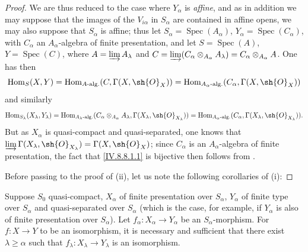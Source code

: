 \begin{proof}
We are thus reduced to the case where $Y_\alpha$ is \emph{affine}, and as in addition we may suppose that the images of the $V_{i\alpha}$ in $S_\alpha$ are contained in affine opens, we may also suppose that $S_\alpha$ is affine; thus let $S_\alpha=\operatorname{Spec}(A_\alpha)$, $Y_\alpha=\operatorname{Spec}(C_\alpha)$, with $C_\alpha$ an $A_\alpha$-algebra of finite presentation, and let $S=\operatorname{Spec}(A)$, $Y=\operatorname{Spec}(C)$, where $A=\varinjlim A_\lambda$ and $C=\varinjlim(C_\alpha\otimes_{A_\alpha}A_\lambda)=C_\alpha\otimes_{A_\alpha}A$.
One has then
\[
  \operatorname{Hom}_S(X,Y)=\operatorname{Hom}_{A\text{-alg.}}(C,\Gamma(X,\sh{O}_X))=\operatorname{Hom}_{A_\alpha\text{-alg.}}(C_\alpha,\Gamma(X,\sh{O}_X))
\]
 and similarly
\[
  \operatorname{Hom}_{S_\lambda}(X_\lambda,Y_\lambda)=\operatorname{Hom}_{A_\lambda\text{-alg.}}(C_\alpha\otimes_{A_\alpha}A_\lambda,\Gamma(X_\lambda,\sh{O}_{X_\lambda}))=\operatorname{Hom}_{A_\alpha\text{-alg.}}(C_\alpha,\Gamma(X_\lambda,\sh{O}_{X_\lambda})).
\]
But as $X_\alpha$ is quasi-compact and quasi-separated, one knows  that $\varinjlim\Gamma(X_\lambda,\sh{O}_{X_\lambda})=\Gamma(X,\sh{O}_X)$; since $C_\alpha$ is an $A_\alpha$-algebra of finite presentation, the fact that \eqref{IV.8.8.1.1} is bijective then follows from .

Before passing to the proof of (ii), let us note the following corollaries of (i):
\end{proof}

\begin{corollary}[8.8.2.4]
\label{IV.8.8.2.4}
Suppose $S_0$ quasi-compact, $X_\alpha$ of finite presentation over $S_\alpha$, $Y_\alpha$ of finite type over $S_\alpha$ and quasi-separated over $S_\alpha$ (which is the case, for example, if $Y_\alpha$ is also
of finite presentation over $S_\alpha$).
Let $f_\alpha:X_\alpha\to Y_\alpha$ be an $S_\alpha$-morphism.
For $f:X\to Y$ to be an isomorphism, it is necessary and sufficient that there exist $\lambda\geqslant\alpha$ such that $f_\lambda:X_\lambda\to Y_\lambda$ is an isomorphism.
\end{corollary}

